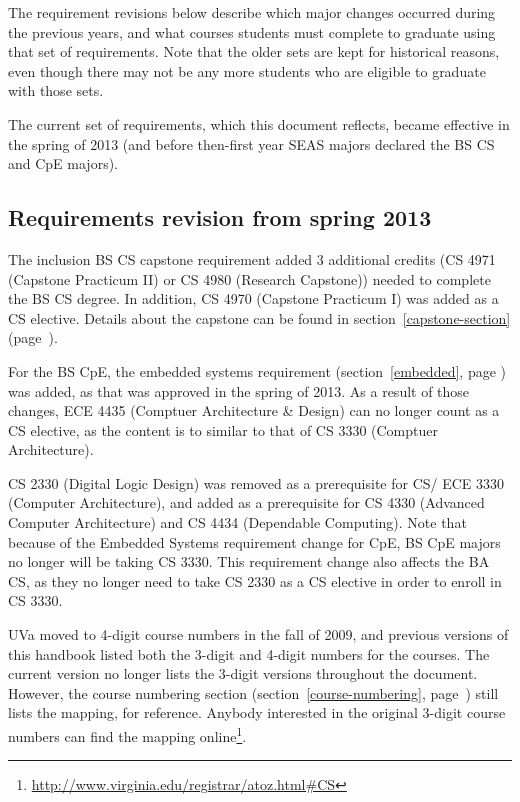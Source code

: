 \documentclass[10pt,letter,twocolumn]{book}
\newcommand{\myurl}[1]{\footnote{\scriptsize\url{#1}}}
\begin{document}
The requirement revisions below describe which major changes occurred
during the previous years, and what courses students must complete to
graduate using that set of requirements. Note that the older sets are
kept for historical reasons, even though there may not be any more
students who are eligible to graduate with those sets.

The current set of requirements, which this document reflects, became
effective in the spring of 2013 (and before then-first year SEAS
majors declared the BS CS and CpE majors).

\subsection{Requirements revision from spring 2013}

The inclusion BS CS capstone requirement added 3 additional credits
(CS 4971 (Capstone Practicum II) or CS 4980 (Research Capstone))
needed to complete the BS CS degree.  In addition, CS 4970 (Capstone
Practicum I) was added as a CS elective.  Details about the capstone
can be found in section~\ref{capstone-section}
(page~\pageref{capstone-section}).

For the BS CpE, the embedded systems requirement
(section~\ref{embedded}, page \pageref{embedded}) was added, as that
was approved in the spring of 2013.  As a result of those changes, ECE
4435 (Comptuer Architecture \& Design) can no longer count as a CS
elective, as the content is to similar to that of CS 3330 (Comptuer
Architecture).

CS 2330 (Digital Logic Design) was removed as a prerequisite for
CS/ ECE 3330 (Computer Architecture), and added as a prerequisite for
CS 4330 (Advanced Computer Architecture) and CS 4434 (Dependable
Computing).  Note that because of the Embedded Systems requirement
change for CpE, BS CpE majors no longer will be taking CS 3330.
This requirement change also affects the BA CS, as they no longer need
to take CS 2330 as a CS elective in order to enroll in CS 3330.

UVa moved to 4-digit course numbers in the fall of 2009, and previous
versions of this handbook listed both the 3-digit and 4-digit numbers
for the courses.  The current version no longer lists the 3-digit
versions throughout the document.  However, the course numbering
section (section~\ref{course-numbering},
page~\pageref{course-numbering}) still lists the mapping, for
reference.  Anybody interested in the original 3-digit course numbers
can find the mapping
online\myurl{http://www.virginia.edu/registrar/atoz.html\#CS}.
\end{document}

